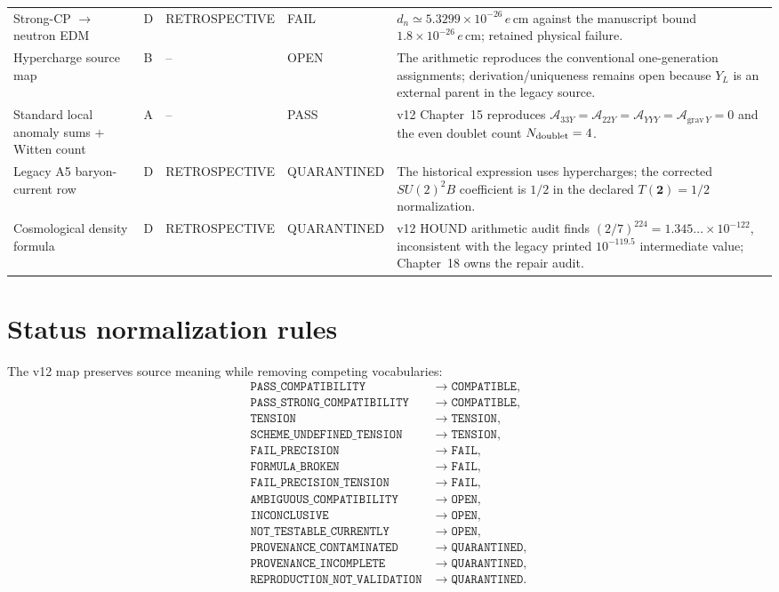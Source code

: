 {\begin{longtable}{p{}p{}p{}p{}p{}}
Strong-CP $\to$ neutron EDM & D & RETROSPECTIVE & FAIL & $d_n\simeq5.3299\times10^{-26}\,e\,\mathrm{cm}$ against the manuscript bound $1.8\times10^{-26}\,e\,\mathrm{cm}$; retained physical failure. \\
Hypercharge source map & B & -- & OPEN & The arithmetic reproduces the conventional one-generation assignments; derivation/uniqueness remains open because $Y_L$ is an external parent in the legacy source. \\
Standard local anomaly sums + Witten count & A & -- & PASS & v12 Chapter~15 reproduces $\mathcal A_{33Y}=\mathcal A_{22Y}=\mathcal A_{YYY}=\mathcal A_{\mathrm{grav}\,Y}=0$ and the even doublet count $N_{\rm doublet}=4$. \\
Legacy A5 baryon-current row & D & RETROSPECTIVE & QUARANTINED & The historical expression uses hypercharges; the corrected $SU(2)^2B$ coefficient is $1/2$ in the declared $T(\mathbf2)=1/2$ normalization. \\
Cosmological density formula & D & RETROSPECTIVE & QUARANTINED & v12 HOUND arithmetic audit finds $(2/7)^{224}=1.345\ldots\times10^{-122}$, inconsistent with the legacy printed $10^{-119.5}$ intermediate value; Chapter~18 owns the repair audit. \\
\bottomrule
\end{longtable}}

\section{Status normalization rules}

The v12 map preserves source meaning while removing competing vocabularies:
\begin{align*}
\texttt{PASS\_COMPATIBILITY}
&\longrightarrow \texttt{COMPATIBLE},\\
\texttt{PASS\_STRONG\_COMPATIBILITY}
&\longrightarrow \texttt{COMPATIBLE},\\
\texttt{TENSION}
&\longrightarrow \texttt{TENSION},\\
\texttt{SCHEME\_UNDEFINED\_TENSION}
&\longrightarrow \texttt{TENSION},\\
\texttt{FAIL\_PRECISION}
&\longrightarrow \texttt{FAIL},\\
\texttt{FORMULA\_BROKEN}
&\longrightarrow \texttt{FAIL},\\
\texttt{FAIL\_PRECISION\_TENSION}
&\longrightarrow \texttt{FAIL},\\
\texttt{AMBIGUOUS\_COMPATIBILITY}
&\longrightarrow \texttt{OPEN},\\
\texttt{INCONCLUSIVE}
&\longrightarrow \texttt{OPEN},\\
\texttt{NOT\_TESTABLE\_CURRENTLY}
&\longrightarrow \texttt{OPEN},\\
\texttt{PROVENANCE\_CONTAMINATED}
&\longrightarrow \texttt{QUARANTINED},\\
\texttt{PROVENANCE\_INCOMPLETE}
&\longrightarrow \texttt{QUARANTINED},\\
\texttt{REPRODUCTION\_NOT\_VALIDATION}
&\longrightarrow \texttt{QUARANTINED}.
\end{align*}

